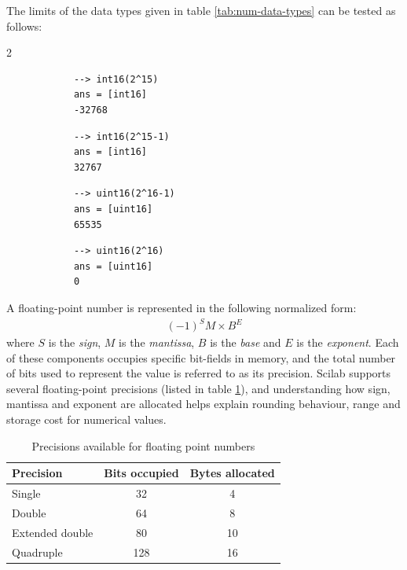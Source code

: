 		The limits of the data types given in table \ref{tab:num-data-types} can be tested as follows:
		\begin{multicols}{2}
		\begin{verbatim}
			--> int16(2^15)
			ans = [int16]
			-32768
		\end{verbatim}
		
		\begin{verbatim}
			--> int16(2^15-1)
			ans = [int16]
			32767
		\end{verbatim}
		
		\begin{verbatim}
			--> uint16(2^16-1)
			ans = [uint16]
			65535
		\end{verbatim}
		
		\begin{verbatim}
			--> uint16(2^16)
			ans = [uint16]
			0
		\end{verbatim}
		\end{multicols}
		
		A floating-point number is represented in the following normalized form:
		\begin{align*}
			(-1)^SM\times B^E
		\end{align*}
		where $S$ is the \textit{sign}, $M$ is the \textit{mantissa}, $B$ is the \textit{base} and $E$ is the \textit{exponent}. Each of these components occupies specific bit-fields in memory, and the total number of bits used to represent the value is referred to as its precision. Scilab supports several floating-point precisions (listed in table \ref{tab:float-precision}), and understanding how sign, mantissa and exponent are allocated helps explain rounding behaviour, range and storage cost for numerical values.
		
		\begin{table}[!htb]
			\centering
			\caption{Precisions available for floating point numbers}
			\label{tab:float-precision}
			\begin{tabular}{lcc}
				\toprule[1.5pt]
				\textbf{Precision} & \textbf{Bits occupied} & \textbf{Bytes allocated} \\
				\midrule[1.2pt]
				{Single} & {32} & {4} \\ \hline
				{Double} & {64} & {8} \\ \hline
				{Extended double} & {80} & {10} \\ \hline
				{Quadruple} & {128} & {16} \\
				\bottomrule[1.5pt]
			\end{tabular}
		\end{table}
		
